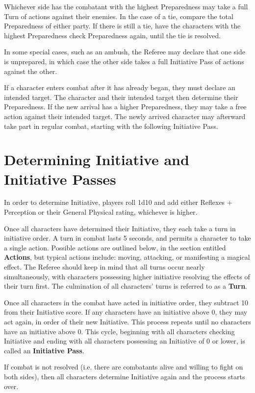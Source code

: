 \documentclass[oneside]{book}
\begin{document}
\begin{multicols}{2}
Whichever side has the combatant with the highest Preparedness may take a full Turn of actions against their enemies. In the case of a tie, compare the total Preparedness of either party. If there is still a tie, have the characters with the highest Preparedness check Preparedness again, until the tie is resolved.

In some special cases, such as an ambush, the Referee may declare that one side is unprepared, in which case the other side takes a full Initiative Pass of actions against the other. 

If a character enters combat after it has already began, they must declare an intended target. The character and their intended target then determine their Preparedness. If the new arrival has a higher Preparedness, they may take a free action against their intended target. The newly arrived character may afterward take part in regular combat, starting with the following Initiative Pass.

\section{Determining Initiative and Initiative Passes}
In order to determine Initiative, players roll 1d10 and add either Reflexes + Perception or their General Physical rating, whichever is higher.

Once all characters have determined their Initiative, they each take a 
turn in initiative order. A turn in combat lasts 5 seconds, and permits a character to take a single action. Possible actions are outlined below, in the section entitled \textbf{Actions}, but typical actions include: moving, attacking, or manifesting a magical effect. The Referee should keep in mind that all turns occur nearly simultaneously, with characters possessing higher initiative resolving the effects of their turn first. The culmination of all characters' turns is referred to as a \textbf{Turn}.

Once all characters in the combat have acted in initiative order, they subtract 10 from their Initiative score. If any characters have an initiative above 0, they may act again, in order of their new Initiative. This process repeats until no characters have an initiative  above 0. This cycle, beginning with all characters checking Initiative and ending with all characters possessing an Initiative of 0 or lower, is called an \textbf{Initiative Pass}.

If combat is not resolved (i.e. there are combatants alive and willing to fight on both sides), then all characters determine Initiative again and the process starts over. 


\end{multicols}
\end{document}
